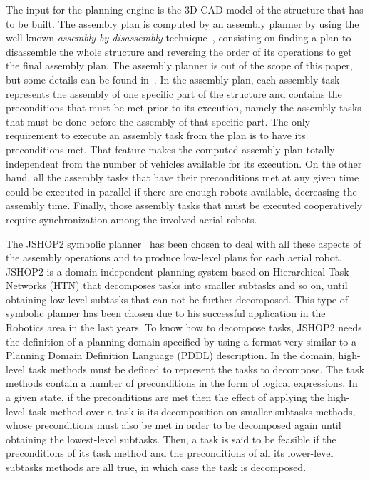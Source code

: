 \documentclass[letterpaper, 10 pt, conference]{ieeeconf}  %
\begin{document}
The input for the planning engine is the 3D CAD model of the structure that has to be built. The assembly plan is computed by an assembly planner by using the well-known \emph{assembly-by-disassembly} technique~\cite{Jimenez2011}, consisting on finding a plan to disassemble the whole structure and reversing the order of its operations to get the final assembly plan. The assembly planner is out of the scope of this paper, but some details can be found in~\cite{munoz_icuas15}. In the assembly plan, each assembly task represents the assembly of one specific part of the structure and contains the preconditions that must be met prior to its execution, namely the assembly tasks that must be done before the assembly of that specific part. The only requirement to execute an assembly task from the plan is to have its preconditions met. That feature makes the computed assembly plan totally independent from the number of vehicles available for its execution. On the other hand, all the assembly tasks that have their preconditions met at any given time could be executed in parallel if there are enough robots available, decreasing the assembly time. Finally, those assembly tasks that must be executed cooperatively require synchronization among the involved aerial robots.

The JSHOP2 symbolic planner~\cite{Nau03shop2} has been chosen to deal with all these aspects of the assembly operations and to produce low-level plans for each aerial robot. JSHOP2 is a domain-independent planning system based on Hierarchical Task Networks (HTN) that decomposes tasks into smaller subtasks and so on, until obtaining low-level subtasks that can not be further decomposed. This type of symbolic planner has been chosen due to his successful application in the Robotics area in the last years. To know how to decompose tasks, JSHOP2 needs the definition of a planning domain specified by using a format very similar to a Planning Domain Definition Language (PDDL) description. In the domain, high-level task methods must be defined to represent the tasks to decompose. The task methods contain a number of preconditions in the form of logical expressions. In a given state, if the preconditions are met then the effect of applying the high-level task method over a task is its decomposition on smaller subtasks methods,  whose preconditions must also be met in order to be decomposed again until obtaining the lowest-level subtasks. Then, a task is said to be feasible if the preconditions of its task method and the preconditions of all its lower-level subtasks methods are all true, in which case the task is decomposed.
\end{document}
